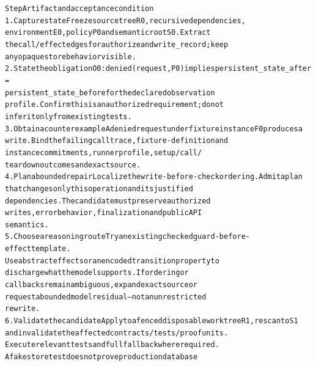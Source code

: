\begingroup\fontsize{7}{8.4}\selectfont
\begin{alltt}
Step                                        Artifact and acceptance condition
1. Capture state                            Freeze source tree R0, recursive dependencies,
                                            environment E0, policy P0 and semantic root S0. Extract
                                            the call/effect edges for authorize and write\_record; keep
                                            any opaque store behavior visible.
2. State the obligation                     O0: denied(request, P0) implies persistent\_state\_after =
                                            persistent\_state\_before for the declared observation
                                            profile. Confirm this is an authorized requirement; do not
                                            infer it only from existing tests.
3. Obtain a counterexample                  A denied request under fixture instance F0 produces a
                                            write. Bind the failing call trace, fixture-definition and
                                            instance commitments, runner profile, setup/call/
                                            teardown outcomes and exact source.
4. Plan a bounded repair                    Localize the write-before-check ordering. Admit a plan
                                            that changes only this operation and its justified
                                            dependencies. The candidate must preserve authorized
                                            writes, error behavior, finalization and public API
                                            semantics.
5. Choose a reasoning route                 Try an existing checked guard-before-effect template.
                                            Use abstract effects or an encoded transition property to
                                            discharge what the model supports. If ordering or
                                            callbacks remain ambiguous, expand exact source or
                                            request a bounded model residual—not an unrestricted
                                            rewrite.
6. Validate the candidate                   Apply to a fenced disposable worktree R1, rescan to S1
                                            and invalidate the affected contracts/tests/proof units.
                                            Execute relevant tests and full fallback where required.
                                            A fake store test does not prove production database

\end{alltt}
